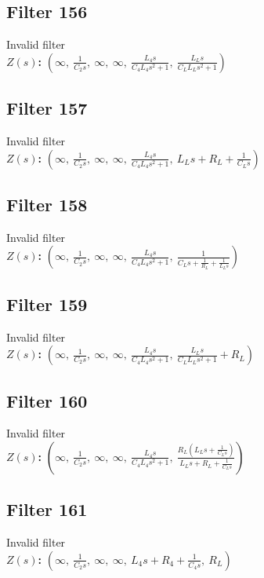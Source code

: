 \documentclass{article}
\begin{document}
\subsection*{Filter 156}
Invalid filter \\ 
\textbf{$Z(s)$:} $\left( \infty, \  \frac{1}{C_{2} s}, \  \infty, \  \infty, \  \frac{L_{4} s}{C_{4} L_{4} s^{2} + 1}, \  \frac{L_{L} s}{C_{L} L_{L} s^{2} + 1}\right)$ \\ 
\subsection*{Filter 157}
Invalid filter \\ 
\textbf{$Z(s)$:} $\left( \infty, \  \frac{1}{C_{2} s}, \  \infty, \  \infty, \  \frac{L_{4} s}{C_{4} L_{4} s^{2} + 1}, \  L_{L} s + R_{L} + \frac{1}{C_{L} s}\right)$ \\ 
\subsection*{Filter 158}
Invalid filter \\ 
\textbf{$Z(s)$:} $\left( \infty, \  \frac{1}{C_{2} s}, \  \infty, \  \infty, \  \frac{L_{4} s}{C_{4} L_{4} s^{2} + 1}, \  \frac{1}{C_{L} s + \frac{1}{R_{L}} + \frac{1}{L_{L} s}}\right)$ \\ 
\subsection*{Filter 159}
Invalid filter \\ 
\textbf{$Z(s)$:} $\left( \infty, \  \frac{1}{C_{2} s}, \  \infty, \  \infty, \  \frac{L_{4} s}{C_{4} L_{4} s^{2} + 1}, \  \frac{L_{L} s}{C_{L} L_{L} s^{2} + 1} + R_{L}\right)$ \\ 
\subsection*{Filter 160}
Invalid filter \\ 
\textbf{$Z(s)$:} $\left( \infty, \  \frac{1}{C_{2} s}, \  \infty, \  \infty, \  \frac{L_{4} s}{C_{4} L_{4} s^{2} + 1}, \  \frac{R_{L} \left(L_{L} s + \frac{1}{C_{L} s}\right)}{L_{L} s + R_{L} + \frac{1}{C_{L} s}}\right)$ \\ 
\subsection*{Filter 161}
Invalid filter \\ 
\textbf{$Z(s)$:} $\left( \infty, \  \frac{1}{C_{2} s}, \  \infty, \  \infty, \  L_{4} s + R_{4} + \frac{1}{C_{4} s}, \  R_{L}\right)$ \\ 
\end{document}

